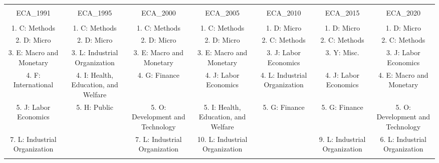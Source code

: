 
\begin{table}[!htbp] \centering 
  \caption{} 
  \label{} 
\scriptsize 
\begin{tabular}{@{\extracolsep{5pt}} ccccccc} 
\\[-1.8ex]\hline 
\hline \\[-1.8ex] 
ECA\_1991 & ECA\_1995 & ECA\_2000 & ECA\_2005 & ECA\_2010 & ECA\_2015 & ECA\_2020 \\ 
\hline \\[-1.8ex] 
1. C: Methods & 1. C: Methods & 1. C: Methods & 1. C: Methods & 1. D: Micro & 1. D: Micro & 1. D: Micro \\ 
2. D: Micro & 2. D: Micro & 2. D: Micro & 2. D: Micro & 2. C: Methods & 2. C: Methods & 2. C: Methods \\ 
3. E: Macro and Monetary & 3. L: Industrial Organization & 3. E: Macro and Monetary & 3. E: Macro and Monetary & 3. J: Labor Economics & 3. Y: Misc. & 3. J: Labor Economics \\ 
4. F: International & 4. I: Health, Education, and Welfare & 4. G: Finance & 4. J: Labor Economics & 4. L: Industrial Organization & 4. J: Labor Economics & 4. E: Macro and Monetary \\ 
5. J: Labor Economics & 5. H: Public & 5. O: Development and Technology & 5. I: Health, Education, and Welfare & 5. G: Finance & 5. G: Finance & 5. O: Development and Technology \\ 
7. L: Industrial Organization &  & 7. L: Industrial Organization & 10. L: Industrial Organization &  & 9. L: Industrial Organization & 6. L: Industrial Organization \\ 
\hline \\[-1.8ex] 
\end{tabular} 
\end{table} 
